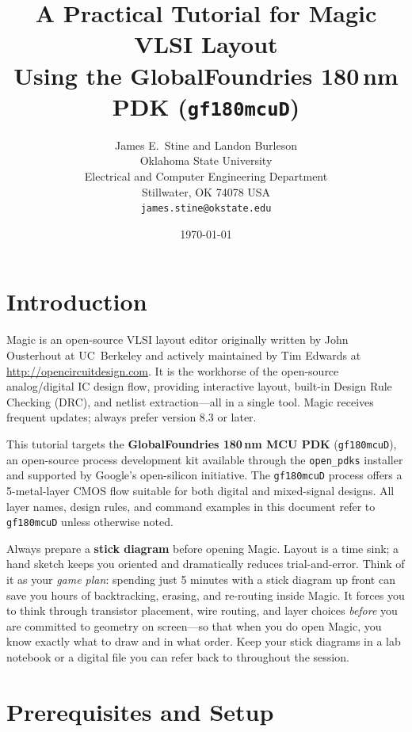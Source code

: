 \documentclass[11pt]{article}
\title{A Practical Tutorial for Magic VLSI Layout\\[4pt]
       \large Using the GlobalFoundries 180\,nm PDK (\texttt{gf180mcuD})}
\author{James E.\ Stine and Landon Burleson\\
        Oklahoma State University\\
        Electrical and Computer Engineering Department\\
        Stillwater, OK 74078 USA\\
        \texttt{james.stine@okstate.edu}}
\date{\today}
\begin{document}
\maketitle
\tableofcontents
\newpage

\section{Introduction}

Magic is an open-source VLSI layout editor originally written by John
Ousterhout at UC~Berkeley and actively maintained by Tim Edwards at
\url{http://opencircuitdesign.com}.
It is the workhorse of the open-source analog/digital IC design flow,
providing interactive layout, built-in Design Rule Checking (DRC), and
netlist extraction---all in a single tool.
Magic receives frequent updates; always prefer version 8.3 or later.

This tutorial targets the \textbf{GlobalFoundries 180\,nm MCU PDK}
(\texttt{gf180mcuD}), an open-source process development kit available
through the \texttt{open\_pdks} installer and supported by Google's
open-silicon initiative.
The \texttt{gf180mcuD} process offers a 5-metal-layer CMOS flow 
suitable for both digital and mixed-signal designs.
All layer names, design rules, and command examples in this document
refer to \texttt{gf180mcuD} unless otherwise noted.

\begin{tipbox}
Always prepare a \textbf{stick diagram} before opening Magic.
Layout is a time sink; a hand sketch keeps you oriented and dramatically
reduces trial-and-error.
Think of it as your \emph{game plan}: spending just 5 minutes with a
stick diagram up front can save you hours of backtracking, erasing, and
re-routing inside Magic.
It forces you to think through transistor placement, wire routing, and
layer choices \emph{before} you are committed to geometry on screen---so
that when you do open Magic, you know exactly what to draw and in what
order.
Keep your stick diagrams in a lab notebook or a digital file you can
refer back to throughout the session.
\end{tipbox}

\section{Prerequisites and Setup}
\end{document}
